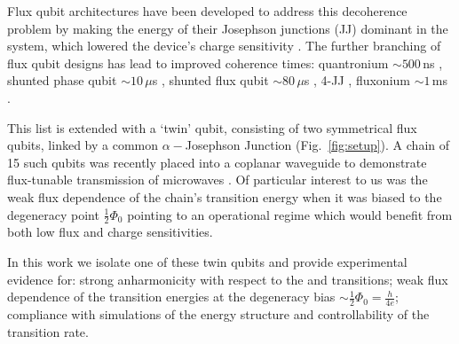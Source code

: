 Flux qubit architectures have been developed to address this decoherence problem by making the
energy of their  Josephson junctions (JJ) dominant  in the system, which  lowered the device's
charge  sensitivity  \cite{orlando1999}  \cite{chiorescu2003} \cite{mooij1999}.   The  further
branching  of  flux   qubit  designs  has  lead  to  improved   coherence  times:  quantronium
$\sim500\,$ns \cite{cottet2002} \cite{gu2017}, shunted phase  qubit $\sim10\,\mu $s \cite{stern2014} ,
shunted  flux  qubit  $\sim80\,\mu$s  \cite{yan2016}  ,  4-JJ  \cite{qui2016},  fluxonium  $\sim1\,$ms
\cite{pop2014}.
 
This list is extended  with a `twin' qubit, consisting of two  symmetrical flux qubits, linked
by a  common $ \alpha-$Josephson  Junction (Fig.~\ref{fig:setup}).  A chain  of 15 such  qubits was
recently  placed  into  a  coplanar  waveguide to  demonstrate  flux-tunable  transmission  of
microwaves \cite{shulga2018}.   Of particular interest to  us was the weak  flux dependence of
the chain's transition energy when it was  biased to the degeneracy point $\frac{1}{2}\Phi_0 $
pointing  to  an  operational regime  which  would  benefit  from  both low  flux  and  charge
sensitivities.
 
In this work we isolate one of these twin qubits and provide experimental evidence for: strong
anharmonicity with respect to the \ilra{} and \ilra{} transitions;
weak   flux    dependence   of    the   transition   energies    at   the    degeneracy   bias
$\sim \frac{1}{2}\Phi_0 =  \frac{h}{4e}$; compliance with simulations of  the energy structure
and controllability of the ~\ilra~ transition rate.

